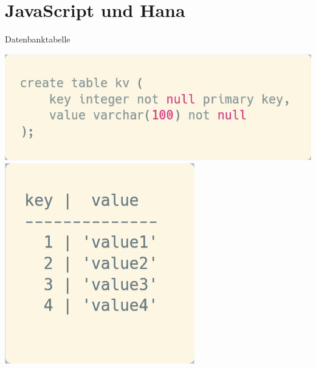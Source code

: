 \documentclass[t,handout]{beamer}
\begin{document}
\section{JavaScript und Hana}

\begin{frame}{Datenbanktabelle}
  \begin{center}
    \includegraphics[scale=.3]{fig/key-value-tabelle.png}\\[.3cm]
    \includegraphics[scale=.3]{fig/key-value-daten.png}
  \end{center}
\end{frame}
\end{document}
